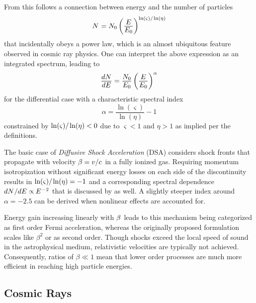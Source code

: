 \begin{spacing}{0.990}
	From this follows a connection between energy and the number of particles
	\begin{equation*}
		N \kern+0.9pt = N_0 \left( \frac{\raisebox{-0.3ex}{$E$}}{\raisebox{0.3ex}{$E_0$}} \right)^{\ln(\varsigma) / \kern-0.5pt \ln(\eta)}
	\end{equation*}
	that incidentally obeys a power law, which is an almost ubiquitous feature
	observed in cosmic ray physics. One can interpret the above expression as an integrated spectrum, leading to
	\begin{equation*}
		\frac{\raisebox{-0.3ex}{$dN$}}{\raisebox{0.3ex}{$dE$}} = \frac{\raisebox{-0.3ex}{$N_0$}}{\raisebox{0.3ex}{$E_0$}}
		\left( \frac{\raisebox{-0.3ex}{$E$}}{\raisebox{0.3ex}{$E_0$}} \right)^\alpha
	\end{equation*}
	for the differential case with a characteristic spectral index
	\begin{equation*}
		\alpha = \frac{\ln(\varsigma)}{\ln(\eta)} - 1
	\end{equation*}
	constrained by $\ln(\varsigma) / \kern-0.5pt \ln(\eta) < 0$ due to $\varsigma < 1$ and $\eta > 1$ as implied per the definitions.
	
	The basic case of \emph{Diffusive Shock Acceleration} (DSA) considers shock fronts that propagate with velocity
	$\kern-0.5pt \beta = v / c \kern+1.0pt$ in a fully ionized gas. Requiring momentum isotropization without significant energy losses
	on each side of the discontinuity results in $\ln(\varsigma) / \kern-0.5pt \ln(\eta) = -1$ and a corresponding spectral dependence
	$dN \kern+0.5pt / dE \propto \kern-0.5pt E^{\kern+0.5pt -2}$ that is discussed by \cite{Longair_2011} as well. A slightly steeper
	index around $\alpha = \num{-2.5}$ can be derived when nonlinear effects are accounted for.
	
	Energy gain increasing linearly with $\kern-0.5pt \beta \kern+1.0pt$ leads to this mechanism being categorized as first order Fermi
	acceleration, whereas the originally proposed formulation scales like $\beta^2$ or as second order. Though shocks exceed the local
	speed of sound in the astrophysical medium, relativistic velocities are typically not achieved. Consequently, ratios of $\beta \ll 1$
	mean that lower order processes are much more efficient in reaching high particle energies.


	\enlargethispage*{2\baselineskip}


	\subsection{Cosmic Rays}
	\label{sub:rays}
	

\end{spacing}
